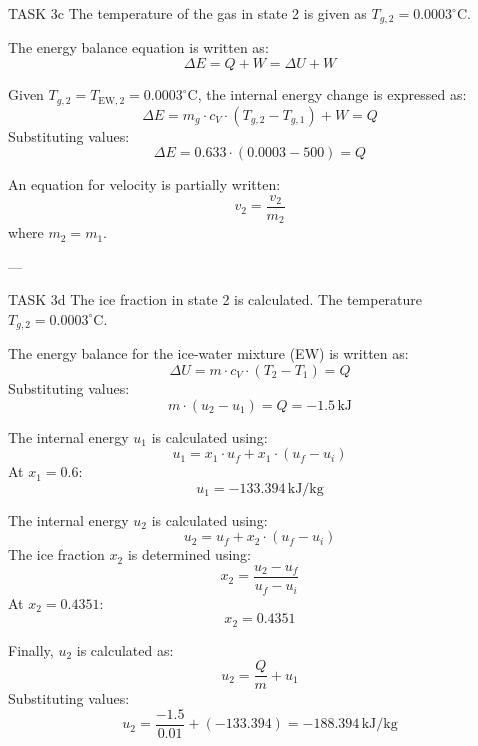 TASK 3c  
The temperature of the gas in state 2 is given as \( T_{g,2} = 0.0003^\circ\text{C} \).  

The energy balance equation is written as:  
\[
\Delta E = Q + W = \Delta U + W
\]  

Given \( T_{g,2} = T_{\text{EW},2} = 0.0003^\circ\text{C} \), the internal energy change is expressed as:  
\[
\Delta E = m_g \cdot c_V \cdot (T_{g,2} - T_{g,1}) + W = Q
\]  
Substituting values:  
\[
\Delta E = 0.633 \cdot (0.0003 - 500) = Q
\]  

An equation for velocity is partially written:  
\[
v_{2} = \frac{v_2}{m_2}
\]  
where \( m_2 = m_1 \).  

---

TASK 3d  
The ice fraction in state 2 is calculated. The temperature \( T_{g,2} = 0.0003^\circ\text{C} \).  

The energy balance for the ice-water mixture (EW) is written as:  
\[
\Delta U = m \cdot c_V \cdot (T_2 - T_1) = Q
\]  
Substituting values:  
\[
m \cdot (u_2 - u_1) = Q = -1.5 \, \text{kJ}
\]  

The internal energy \( u_1 \) is calculated using:  
\[
u_1 = x_1 \cdot u_f + x_1 \cdot (u_f - u_i)
\]  
At \( x_1 = 0.6 \):  
\[
u_1 = -133.394 \, \text{kJ/kg}
\]  

The internal energy \( u_2 \) is calculated using:  
\[
u_2 = u_f + x_2 \cdot (u_f - u_i)
\]  
The ice fraction \( x_2 \) is determined using:  
\[
x_2 = \frac{u_2 - u_f}{u_f - u_i}
\]  
At \( x_2 = 0.4351 \):  
\[
x_2 = 0.4351
\]  

Finally, \( u_2 \) is calculated as:  
\[
u_2 = \frac{Q}{m} + u_1
\]  
Substituting values:  
\[
u_2 = \frac{-1.5}{0.01} + (-133.394) = -188.394 \, \text{kJ/kg}
\]